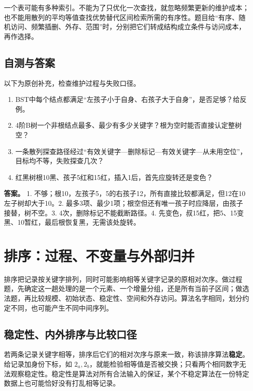 一个表可能有多种索引。不能为了只优化一次查找，就忽略频繁更新的维护成本；也不能用散列的平均等值查找优势替代区间检索所需的有序性。题目给``有序、随机访问、频繁插删、外存、范围''时，分别把它们转成结构成立条件与访问成本，再作选择。

\section{自测与答案}\label{ds-ch7-check}

以下为原创补充，检查维护过程与失败口径。

\begin{enumerate}
\def\labelenumi{\arabic{enumi}.}
\tightlist
\item
  BST中每个结点都满足``左孩子小于自身、右孩子大于自身''，是否足够？给反例。
\item
  4阶B树一个非根结点最多、最少有多少关键字？根为空时能否直接认定整树空？
\item
  一条散列探查路径经过``有效关键字---删除标记---有效关键字---从未用空位''，目标均不等，失败探查几次？
\item
  红黑树根10黑、孩子5红和15红，插入1后，首先应旋转还是变色？
\end{enumerate}

\textbf{答案。} 1. 不够；根10，左孩子5，5的右孩子12，所有直接比较都满足，但12在10左子树却大于10。2. 最多3项、最少1项；根空但还有唯一孩子时应降层，由孩子接替，树不空。3. 4次，删除标记不能截断路径。4. 先变色，叔15红，把5、15变黑、10暂红，最后根恢复黑，无需该处旋转。

\chapter{排序：过程、不变量与外部归并}\label{ds-ch8}

排序把记录按关键字排列，同时可能影响相等关键字记录的原相对次序。做过程题，先确定这一趟处理的是一个元素、一个增量分组，还是所有当前子区间；做选法题，再比较规模、初始状态、稳定性、空间和外存访问。算法名字相同，划分约定不同，也可能产生不同中间序列。

\section{稳定性、内外排序与比较口径}\label{ds-08-01}

若两条记录关键字相等，排序后它们的相对次序与原来一致，称该排序算法\textbf{稳定}。给记录加身份下标，如 \(2_a,2_b\)，就能检验相等值是否被交换；只看两个相同数字无法观察稳定性。稳定性是算法对所有合法输入的保证，某个不稳定算法在一份特定数据上也可能恰好没有打乱相等记录。

